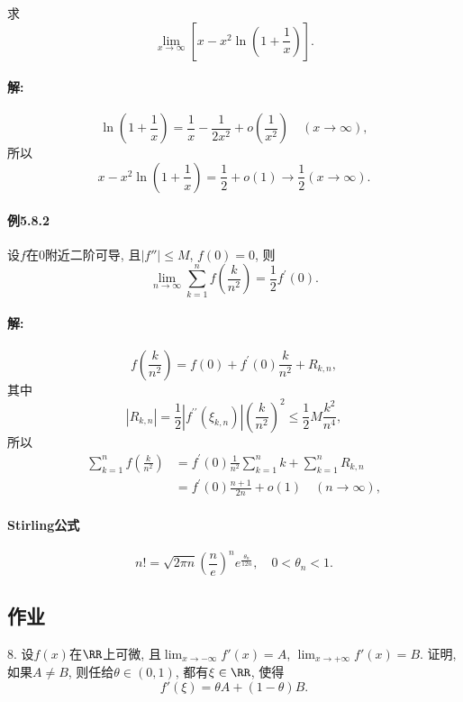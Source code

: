 求
\[
\lim_{x\rightarrow\infty}\left[x-x^{2}\ln\left(1+\frac{1}{x}\right)\right].
\]


\paragraph{解:}

\[
\ln\left(1+\frac{1}{x}\right)=\frac{1}{x}-\frac{1}{2x^{2}}+o\left(\frac{1}{x^{2}}\right)\quad(x\rightarrow\infty),
\]
所以
\[
x-x^{2}\ln\left(1+\frac{1}{x}\right)=\frac{1}{2}+o(1)\rightarrow\frac{1}{2}(x\rightarrow\infty).
\]


\paragraph{例5.8.2}

设$f$在$0$附近二阶可导, 且$\left|f''\right|\le M$, $f(0)=0$, 则
\[
\lim_{n\rightarrow\infty}\sum_{k=1}^{n}f\left(\frac{k}{n^{2}}\right)=\frac{1}{2}f^{\prime}(0).
\]


\paragraph{解:}

\[
f\left(\frac{k}{n^{2}}\right)=f(0)+f^{\prime}(0)\frac{k}{n^{2}}+R_{k,n},
\]
其中
\[
\left|R_{k,n}\right|=\frac{1}{2}\left|f^{\prime\prime}\left(\xi_{k,n}\right)\right|\left(\frac{k}{n^{2}}\right)^{2}\leqslant\frac{1}{2}M\frac{k^{2}}{n^{4}},
\]
所以
\[
\begin{aligned}\sum_{k=1}^{n}f\left(\frac{k}{n^{2}}\right) & =f^{\prime}(0)\frac{1}{n^{2}}\sum_{k=1}^{n}k+\sum_{k=1}^{n}R_{k,n}\\
 & =f^{\prime}(0)\frac{n+1}{2n}+o(1)\quad(n\rightarrow\infty),
\end{aligned}
\]


\paragraph{Stirling公式}

\[
n!=\sqrt{2\pi n}\left(\frac{n}{e}\right)^{n}e^{\frac{\theta_{n}}{12n}},\quad0<\theta_{n}<1.
\]


\subsection{作业}

8. 设$f(x)$在$\RR$上可微, 且$\lim_{x\to-\infty}f'(x)=A$, $\lim_{x\to+\infty}f'(x)=B$.
证明, 如果$A\ne B$, 则任给$\theta\in(0,1)$, 都有$\xi\in\RR$, 使得
\[
f'(\xi)=\theta A+(1-\theta)B.
\]

